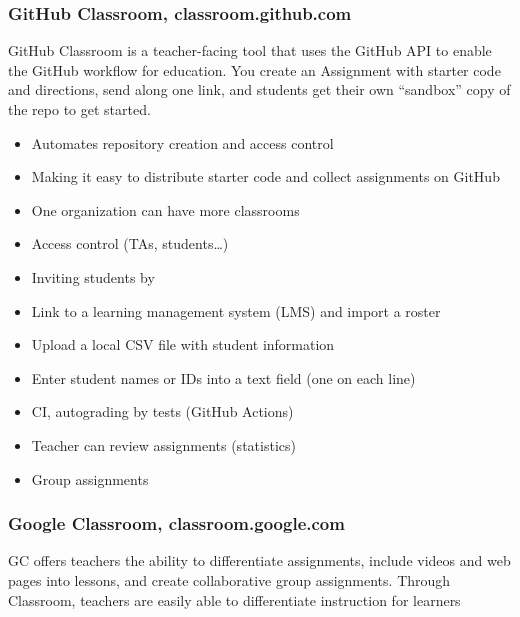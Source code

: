 \subsubsection{GitHub Classroom, classroom.github.com}

{GitHub Classroom is a teacher-facing tool that uses the GitHub API to enable the GitHub workflow for education. You create an Assignment with starter code and directions, send along one link, and students get their own ``sandbox'' copy of the repo to get started.}

\begin{itemize}
\item
  {Automates repository creation and access control}
\item
  {Making it easy to distribute starter code and collect assignments on GitHub}
\item
  {One organization can have more classrooms}
\item
  {Access control (TAs, students\ldots{})}
\item
  {Inviting students by}
\end{itemize}

\begin{itemize}
\item
  {Link to a learning management system (LMS) and import a roster}
\item
  {Upload a local CSV file with student information}
\item
  {Enter student names or IDs into a text field (one on each line)}
\end{itemize}

\begin{itemize}
\item
  {CI, autograding by tests (GitHub Actions)}
\item
  {Teacher can review assignments (statistics)}
\item
  {Group assignments}
\end{itemize}

\subsubsection{Google Classroom, classroom.google.com}

{GC offers teachers the ability to differentiate assignments, include videos and web pages into lessons, and create collaborative group assignments. Through Classroom, teachers are easily able to differentiate instruction for learners}

